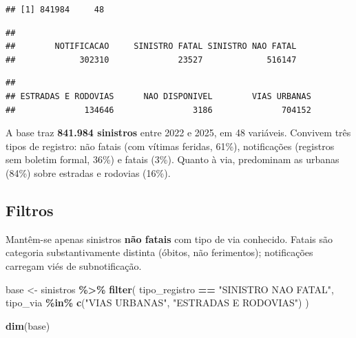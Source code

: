\documentclass[
  11pt,
]{article}
\newenvironment{Shaded}{\begin{snugshade}}{\end{snugshade}}
\newcommand{\FunctionTok}[1]{\textcolor[rgb]{0.13,0.29,0.53}{\textbf{#1}}}
\newcommand{\NormalTok}[1]{#1}
\newcommand{\OtherTok}[1]{\textcolor[rgb]{0.56,0.35,0.01}{#1}}
\newcommand{\SpecialCharTok}[1]{\textcolor[rgb]{0.81,0.36,0.00}{\textbf{#1}}}
\newcommand{\StringTok}[1]{\textcolor[rgb]{0.31,0.60,0.02}{#1}}
\begin{document}
\begin{verbatim}
## [1] 841984     48
\end{verbatim}

\begin{Shaded}
\end{Shaded}

\begin{verbatim}
## 
##        NOTIFICACAO     SINISTRO FATAL SINISTRO NAO FATAL 
##             302310              23527             516147
\end{verbatim}

\begin{Shaded}
\end{Shaded}

\begin{verbatim}
## 
## ESTRADAS E RODOVIAS      NAO DISPONIVEL        VIAS URBANAS 
##              134646                3186              704152
\end{verbatim}

A base traz \textbf{841.984 sinistros} entre 2022 e 2025, em 48
variáveis. Convivem três tipos de registro: não fatais (com vítimas
feridas, 61\%), notificações (registros sem boletim formal, 36\%) e
fatais (3\%). Quanto à via, predominam as urbanas (84\%) sobre estradas
e rodovias (16\%).

\subsection{Filtros}\label{filtros}

Mantêm-se apenas sinistros \textbf{não fatais} com tipo de via
conhecido. Fatais são categoria substantivamente distinta (óbitos, não
ferimentos); notificações carregam viés de subnotificação.

\begin{Shaded}
\begin{Highlighting}[]
\NormalTok{base }\OtherTok{\textless{}{-}}\NormalTok{ sinistros }\SpecialCharTok{\%\textgreater{}\%}
  \FunctionTok{filter}\NormalTok{(}
\NormalTok{    tipo\_registro }\SpecialCharTok{==} \StringTok{"SINISTRO NAO FATAL"}\NormalTok{,}
\NormalTok{    tipo\_via }\SpecialCharTok{\%in\%} \FunctionTok{c}\NormalTok{(}\StringTok{"VIAS URBANAS"}\NormalTok{, }\StringTok{"ESTRADAS E RODOVIAS"}\NormalTok{)}
\NormalTok{  )}

\FunctionTok{dim}\NormalTok{(base)}
\end{Highlighting}
\end{Shaded}
\end{document}

